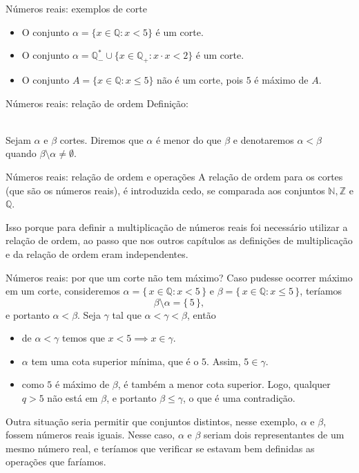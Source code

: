 \documentclass[xcolor=dvipsnames]{beamer}
\begin{document}
\begin{frame}{Números reais: exemplos de corte}
    \begin{itemize}
        \item O conjunto $\alpha = \{ x \in \mathbb{Q} : x < 5 \}$ é um corte.
        \item O conjunto $\alpha =  \mathbb{Q}_{-}^* \cup \{ x \in \mathbb{Q_{+}} : x \cdot x < 2 \} $ é um corte.
        \item O conjunto $A = \{ x \in \mathbb{Q} : x \leq 5 \}$ não é um corte, pois $5$ é máximo de $A$.
    \end{itemize}
\end{frame}

\begin{frame}{Números reais: relação de ordem}
    Definição: \\~\
    
    Sejam $\alpha$ e $\beta$ cortes. Diremos que $\alpha$ é menor do que $\beta$ e denotaremos $\alpha < \beta$ quando $\beta \setminus \alpha \neq \emptyset$.    
\end{frame}

\begin{frame}{Números reais: relação de ordem e operações}
    A relação de ordem para os cortes (que são os números reais), é introduzida cedo, se comparada aos conjuntos $\mathbb{N}, \mathbb{Z}$ e $\mathbb{Q}$. 

    Isso porque para definir a multiplicação de números reais foi necessário utilizar a relação de ordem, ao passo que nos outros capítulos as definições de multiplicação e da relação de ordem eram independentes.  
\end{frame}

\begin{frame}{Números reais: por que um corte não tem máximo?}
    Caso pudesse ocorrer máximo em um corte, consideremos $\alpha = \{\,x \in \mathbb{Q} : x < 5\,\} $ e $\beta = \{\,x \in \mathbb{Q} : x \leq 5\,\}$, teríamos
    \[ \beta \setminus \alpha = \{\, 5 \,\},\] e portanto $\alpha < \beta$. Seja $\gamma$ tal que $\alpha < \gamma < \beta$, então 
    \begin{itemize}
        \item de $\alpha < \gamma$ temos que $x < 5 \implies x \in \gamma$.
        \item $\alpha$ tem uma cota superior mínima, que é o $5$. Assim, $5 \in \gamma$.
        \item como $5$ é máximo de $\beta$, é também a menor cota superior. Logo, qualquer $q > 5$ não está em $\beta$, e portanto $\beta \leq \gamma$, o que é uma contradição.
    \end{itemize}
    Outra situação seria permitir que conjuntos distintos, nesse exemplo, $\alpha$ e $\beta$, fossem números reais iguais. Nesse caso, $\alpha$ e $\beta$ seriam dois representantes de um mesmo número real, e teríamos que verificar se estavam bem definidas as operações que faríamos. 
\end{frame}
\end{document}
